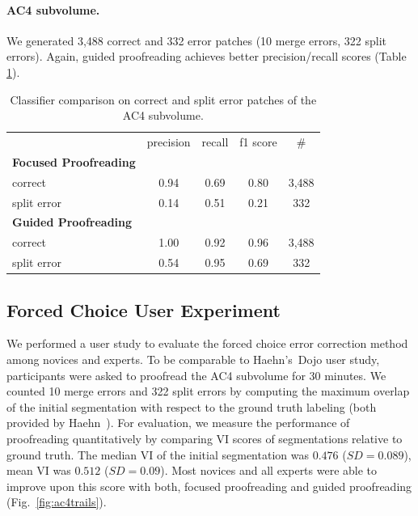 \paragraph{AC4 subvolume.} We generated 3,488 correct and 332 error patches (10 merge errors, 322 split errors). Again, guided proofreading achieves better precision/recall scores (Table \ref{tab:prac4}).

\begin{table}[h]
\caption{Classifier comparison on correct and split error patches of the AC4 subvolume.}%

\small{
\begin{tabular}{l|c|c|c|c}

 & precision & recall & f1 score & \# \\ 
\textbf{Focused Proofreading} & ~ & ~ & ~ & ~ \\ 
correct & 0.94 & 0.69 & 0.80 & 3,488 \\ 
split error & 0.14 & 0.51 & 0.21 & 332 \\ 
\textbf{Guided Proofreading} & ~ & ~ & ~ & ~ \\ 
correct & 1.00 & 0.92 & 0.96 & 3,488 \\ 
split error & 0.54 & 0.95 & 0.69 & 332 \\ 
\end{tabular} 
}
\label{tab:prac4}
\end{table}

\subsection{Forced Choice User Experiment}
We performed a user study to evaluate the forced choice error correction method among novices and experts. To be comparable to Haehn's~\etal Dojo user study, participants were asked to proofread the AC4 subvolume for 30 minutes. We counted 10 merge errors and 322 split errors by computing the maximum overlap of the initial segmentation with respect to the ground truth labeling (both provided by Haehn~\etal). For evaluation, we measure the performance of proofreading quantitatively by comparing VI scores of segmentations relative to ground truth. The median VI of the initial segmentation was $0.476$ ($SD=0.089$), mean VI was $0.512$ ($SD=0.09$). Most novices and all experts were able to improve upon this score with both, focused proofreading and guided proofreading (Fig.~\ref{fig:ac4trails}).

